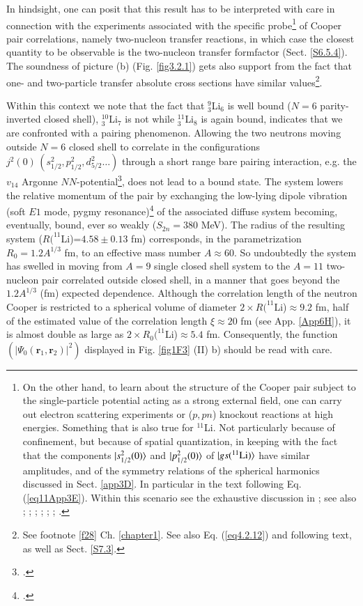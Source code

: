 In hindsight, one can posit that this result has to be interpreted with care in connection   with the experiments associated with the specific probe\footnote{On the other hand, to learn about  the structure of the Cooper pair subject to the single-particle potential acting as a strong external field, one can carry out electron scattering experiments or ($p,pn$) knockout reactions at high energies. Something that is also true for $^{11}$Li. Not particularly because of confinement, but because of spatial quantization, in keeping with the fact that the components $|{s_{1/2}^2(0)} \rangle$ and $|{p_{1/2}^2(0)} \rangle$ of  $|{gs(^{11}\text{Li})} \rangle$ have similar amplitudes, and of the symmetry relations of the spherical harmonics discussed in Sect. \ref{app3D}. In particular in the text following Eq. (\ref{eq11App3E}).  Within this scenario see the exhaustive discussion in \cite{Kubota:20}; see also \cite{Hansen:87}; \cite{Bertsch:91}; \cite{Esbensen:97}; \cite{Matsuo:05}; \cite{Hagino:05}; \cite{Matsuo:06}; \cite{Hagino:07,Sagawa:07,Hagino:07b,Matsuo:13}.} of Cooper pair correlations, namely two-nucleon transfer reactions, in which case the closest quantity to be observable is the two-nucleon transfer formfactor (Sect. \ref{S6.5.4}).
 The soundness of picture (b) (Fig. \ref{fig3.2.1}) gets also support from  the fact that one- and two-particle transfer  absolute cross sections have similar values\footnote{\label{f24} See footnote \ref{f28} Ch. \ref{chapter1}. See also Eq. (\ref{eq4.2.12}) and following text, as well as Sect. \ref{S7.3}.}. 


 Within this context we note that the fact that $^9_3$Li$_6$ is well bound ($N=6$  parity-inverted closed shell), $^{10}_3$Li$_7$ is not while $^{11}_3$Li$_8$ is again bound, indicates that we are confronted with a pairing phenomenon. Allowing the two neutrons moving outside $N=6$ closed shell to correlate in the configurations $j^2(0)\, (s_{1/2}^2, p_{1/2}^2, d_{5/2}^2\dots)$ through a short range bare pairing interaction, e.g. the $v_{14}$ Argonne $NN$-potential\footnote{\cite{Wiringa:84}.}, does not lead to a bound state. The system lowers the relative momentum of the pair by exchanging  the low-lying dipole vibration (soft $E1$ mode, pygmy resonance)\footnote{\cite{Broglia:19}.} of the associated diffuse system becoming, eventually, bound, ever so weakly ($S_{2n}=380$ MeV). The radius of the resulting system ($R(^{11}$Li)=$4.58\pm 0.13$ fm) corresponds, in the parametrization $R_0=1.2 A^{1/3}$ fm, to an effective mass number $A\approx 60$. So undoubtedly the system has swelled in moving from $A=9$ single closed shell system to the $A=11$ two-nucleon pair correlated outside closed shell, in a manner that goes beyond the $1.2A^{1/3}$ (fm) expected dependence. Although the correlation length of the neutron Cooper is restricted to a spherical volume of diameter $2\times R(^{11}$Li)$\approx 9.2$ fm, half of the estimated value of the correlation length 
  $\xi\approx 20$ 
   fm (see App. \ref{App6H}), it is almost double as large as $2\times R_0(^{11}$Li)$\approx 5.4$ fm. Consequently, the function $(|\Psi_0(\mathbf r_1,\mathbf r_2)|^2)$ displayed  in Fig. \ref{fig1F3} (II) b) should be read with care.

